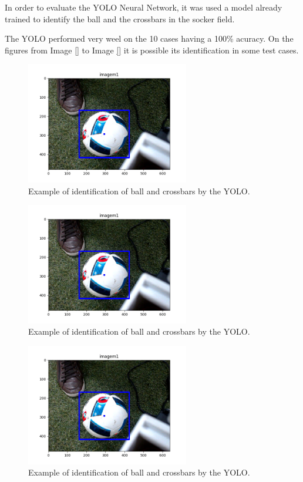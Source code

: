 \documentclass[journal]{IEEEtran}
\begin{document}
In order to evaluate the YOLO Neural Network, it was used a model already trained to identify the ball and the crossbars in the socker field.

The YOLO performed very weel on the 10 cases having a 100\% acuracy. On the figures from Image \ref{} to Image \ref{} it is possible its identification in some test cases.

\begin{figure}
  \begin{center}
  \includegraphics[width=2.8in]{./../code/imagem1_detection.png}
  \caption{Example of identification of ball and crossbars by the YOLO.}
  \label{img:classification_one}
  \end{center}
\end{figure}

\begin{figure}
  \begin{center}
  \includegraphics[width=2.8in]{./../code/imagem1_detection.png}
  \caption{Example of identification of ball and crossbars by the YOLO.}
  \label{img:classification_one}
  \end{center}
\end{figure}

\begin{figure}
  \begin{center}
  \includegraphics[width=2.8in]{./../code/imagem1_detection.png}
  \caption{Example of identification of ball and crossbars by the YOLO.}
  \label{img:classification_one}
  \end{center}
\end{figure}
\end{document}
